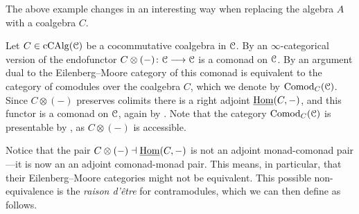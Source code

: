 The above example changes in an interesting way when replacing the algebra $A$ with a coalgebra $C$. 

\begin{example}
    \label{ch2:ex:coalgebra-comonad}
    Let $C\in \operatorname{cCAlg}(\EuScript{C})$ be a cocommutative coalgebra in $\EuScript{C}$. By an $\infty$-categorical version of \cite[2.5]{hristova-jones-rumynin_2023} the endofunctor $C\otimes(-)\colon\EuScript{C}\longrightarrow\EuScript{C}$ is a comonad on $\EuScript{C}$. By an argument dual to \cite[1.17]{christ_2023} the Eilenberg--Moore category of this comonad is equivalent to the category of comodules over the coalgebra $C$, which we denote by $\mathrm{Comod}_C(\EuScript{C})$. Since $C\otimes (-)$ preserves colimits there is a right adjoint $\operatorname{\underline{Hom}}(C,-)$, and this functor is a comonad on $\EuScript{C}$, again by \cite[2.5]{hristova-jones-rumynin_2023}. Note that the category $\mathrm{Comod}_C(\EuScript{C})$ is presentable by \cite[3.8]{ramzi_2024}, as $C\otimes (-)$ is accessible. 
\end{example}

Notice that the pair $C\otimes(-)\dashv \operatorname{\underline{Hom}}(C,-)$ is not an adjoint monad-comonad pair---it is now an an adjoint comonad-monad pair. This means, in particular, that their Eilenberg--Moore categories might not be equivalent. This possible non-equivalence is the \emph{raison d'être} for contramodules, which we can then define as follows. 





